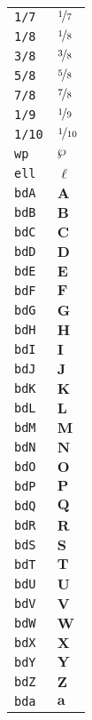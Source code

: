 \begin{longtable}{ll}
\texttt{1/7}&${}\nicefrac{1}{7} {}$\\
\texttt{1/8}&${}\nicefrac{1}{8} {}$\\
\texttt{3/8}&${}\nicefrac{3}{8} {}$\\
\texttt{5/8}&${}\nicefrac{5}{8} {}$\\
\texttt{7/8}&${}\nicefrac{7}{8} {}$\\
\texttt{1/9}&${}\nicefrac{1}{9} {}$\\
\texttt{1/10}&${}\nicefrac{1}{10} {}$\\
\texttt{wp}&${}\wp {}$\\
\texttt{ell}&${}\ell {}$\\
\texttt{bdA}&${}\textbf{A}{}$\\
\texttt{bdB}&${}\textbf{B}{}$\\
\texttt{bdC}&${}\textbf{C}{}$\\
\texttt{bdD}&${}\textbf{D}{}$\\
\texttt{bdE}&${}\textbf{E}{}$\\
\texttt{bdF}&${}\textbf{F}{}$\\
\texttt{bdG}&${}\textbf{G}{}$\\
\texttt{bdH}&${}\textbf{H}{}$\\
\texttt{bdI}&${}\textbf{I}{}$\\
\texttt{bdJ}&${}\textbf{J}{}$\\
\texttt{bdK}&${}\textbf{K}{}$\\
\texttt{bdL}&${}\textbf{L}{}$\\
\texttt{bdM}&${}\textbf{M}{}$\\
\texttt{bdN}&${}\textbf{N}{}$\\
\texttt{bdO}&${}\textbf{O}{}$\\
\texttt{bdP}&${}\textbf{P}{}$\\
\texttt{bdQ}&${}\textbf{Q}{}$\\
\texttt{bdR}&${}\textbf{R}{}$\\
\texttt{bdS}&${}\textbf{S}{}$\\
\texttt{bdT}&${}\textbf{T}{}$\\
\texttt{bdU}&${}\textbf{U}{}$\\
\texttt{bdV}&${}\textbf{V}{}$\\
\texttt{bdW}&${}\textbf{W}{}$\\
\texttt{bdX}&${}\textbf{X}{}$\\
\texttt{bdY}&${}\textbf{Y}{}$\\
\texttt{bdZ}&${}\textbf{Z}{}$\\
\texttt{bda}&${}\textbf{a}{}$\\

\end{longtable}
